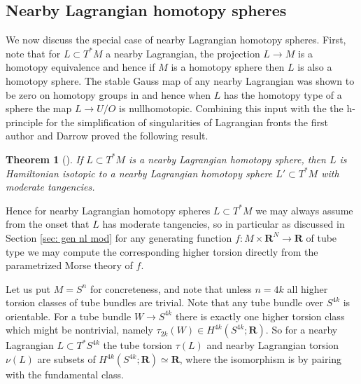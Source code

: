 \documentclass{amsart}
\def\bR{\mathbf{R}}
\newtheorem{theorem}{Theorem}[section]
\theoremstyle{definition}
\theoremstyle{remark}
\newtheorem{inductive lemma}[theorem]{Inductive Lemma}
\begin{document}
\subsection{Nearby Lagrangian homotopy spheres}

We now discuss the special case of nearby Lagrangian homotopy spheres. First, note that for $L \subset T^*M$ a nearby Lagrangian, the projection $L \to M$ is a homotopy equivalence and hence if $M$ is a homotopy sphere then $L$ is also a homotopy sphere. The stable Gauss map of any nearby Lagrangian was shown to be zero on homotopy groups in \cite{ACGK} and hence when $L$ has the homotopy type of a sphere the map $L \to U/O$ is nullhomotopic. Combining this input with the the h-principle for the simplification of singularities of Lagrangian fronts \cite{AG18a,AG18b} the first author and Darrow proved the following result. 

\begin{theorem}[\cite{AD22}]\label{thm: near spheres sing}
If $L \subset T^*M$ is a nearby Lagrangian homotopy sphere, then $L$ is Hamiltonian isotopic to a nearby Lagrangian homotopy sphere $L' \subset T^*M$ with moderate tangencies. 
\end{theorem}

Hence for nearby Lagrangian homotopy spheres $L \subset T^*M$ we may always assume from the onset that $L$ has moderate tangencies, so in particular as discussed in Section \ref{sec: gen nl mod} for any generating function $f:M \times \bR^N \to \bR$ of tube type we may compute the corresponding higher torsion directly from the parametrized Morse theory of $f$.

Let us put $M=S^n$ for concreteness, and note that unless $n=4k$ all higher torsion classes of tube bundles are trivial. Note that any tube bundle over $S^{4k}$ is orientable. For a tube bundle $W \to S^{4k}$ there is exactly one higher torsion class which might be nontrivial, namely $\tau_{2k}(W) \in H^{4k}(S^{4k};\bR)$. So for a nearby Lagrangian $L \subset T^*S^{4k}$ the tube torsion $\tau(L)$ and nearby Lagrangian torsion $\nu(L)$ are subsets of $H^{4k}(S^{4k};\bR) \simeq \bR$, where the isomorphism is by pairing with the fundamental class. 
\end{document}
